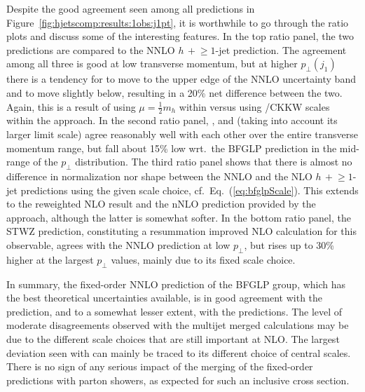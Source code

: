 Despite the good agreement seen among all predictions in
Figure~\ref{fig:hjetscomp:results:1obs:j1pt}, it is worthwhile to go
through the ratio plots and discuss some of the interesting features.
In the top ratio panel, the two \NNLOPS predictions are compared to the
NNLO $h\,+\!\ge\!\!1$-jet prediction. The agreement among all three is
good at low transverse momentum, but at higher $p_\perp(j_1)$ there is
a tendency for \Sherpa \NNLOPS to move to the upper edge of the NNLO 
uncertainty band and \Powheg \NNLOPS to move slightly below, resulting 
in a 20\% net difference between the two. Again, this is a result of using
$\mu=\tfrac{1}{2}m_h$ within \Sherpa versus using \Minlo/CKKW scales within the
\Powheg approach. In the second ratio panel, \Herwig, \Sherpa and \MGaMC
(taking into account its larger limit scale) agree reasonably well
with each other over the entire transverse momentum range, but fall
about 15\% low wrt.~the BFGLP prediction in the mid-range of the
$p_\perp$ distribution. The third ratio panel shows that there is almost no
difference in normalization nor shape between the NNLO and the NLO
$h\,+\!\ge\!\!1$-jet predictions using the given scale choice,
cf.~Eq.~(\ref{eq:bfglpScale}). This extends to the \Minlo reweighted
NLO result and the nNLO prediction provided by the \Loopsim approach, although the
latter is somewhat softer. In the bottom ratio panel, the STWZ prediction, 
constituting a resummation improved NLO calculation for this observable,  
agrees with the NNLO prediction at low $p_\perp$, but rises up to 30\%
higher at the largest $p_\perp$ values, mainly due to its fixed scale choice. 

In summary, the fixed-order NNLO prediction of the BFGLP group, which
has the best theoretical uncertainties available, is in good agreement
with the \Sherpa \NNLOPS prediction, and to a
somewhat lesser extent, with the \Powheg \NNLOPS predictions. The level of
moderate disagreements observed with the multijet merged calculations 
may be due to the different scale choices that are still important 
at NLO. The largest deviation seen with \MGaMC can mainly be traced to 
its different choice of central scales. There is no sign of any serious 
impact of the merging of the
fixed-order predictions with parton showers, as expected for such an
inclusive cross section.

